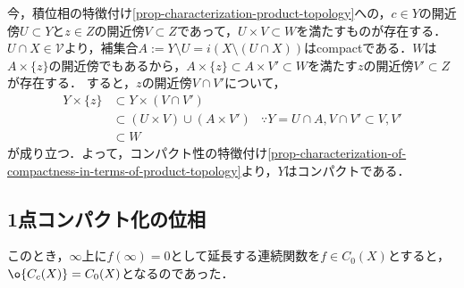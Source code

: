 \documentclass[uplatex,dvipdfmx]{jsreport}
\begin{document}
\begin{Proof}
\begin{description}
\begin{description}
            今，積位相の特徴付け\ref{prop-characterization-product-topology}への，$c\in Y$の開近傍$U\subset Y$と$z\in Z$の開近傍$V\subset Z$であって，$U\times V\subset W$を満たすものが存在する．
            $U\cap X\in\mathcal{V}$より，補集合$A:=Y\setminus U=i(X\setminus(U\cap X))$はcompactである．$W$は$A\times\{z\}$の開近傍でもあるから，$A\times\{z\}\subset A\times V'\subset W$を満たす$z$の開近傍$V'\subset Z$が存在する．
            すると，$z$の開近傍$V\cap V'$について，
            \begin{align*}
                Y\times\{z\}&\subset Y\times(V\cap V')\\
                &\subset (U\times V)\cup(A\times V')&\because Y=U\cap A,V\cap V'\subset V,V'\\
                &\subset W
            \end{align*}
            が成り立つ．よって，コンパクト性の特徴付け\ref{prop-characterization-of-compactness-in-terms-of-product-topology}より，$Y$はコンパクトである．
        \end{description}
    \end{description}
\end{Proof}

\subsection{1点コンパクト化の位相}

\begin{tcolorbox}[colframe=ForestGreen, colback=ForestGreen!10!white,breakable,colbacktitle=ForestGreen!40!white,coltitle=black,fonttitle=\bfseries\sffamily,
title=]
    このとき，$\infty$上に$f(\infty)=0$として延長する連続関数を$f\in C_0(X)$とすると，$\o{C_c(X)}=C_0(X)$となるのであった．
\end{tcolorbox}
\end{document}
